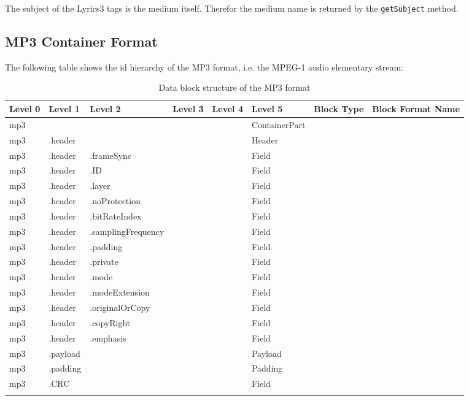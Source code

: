 
The subject of the Lyrics3 tags is the medium itself. Therefor the medium name is returned by the \texttt{getSubject} method.


\subsection{MP3 Container Format}
\label{sec:MP3ContainerFormat}

The following table shows the id hierarchy of the MP3 format, i.e. the MPEG-1 audio elementary stream:

\begin{longtable}{|p{}|p{}|p{}|p{}|p{}|p{}|p{}|}
	\hline
	Level 0 & Level 1 & Level 2 & Level 3 & Level 4 & Level 5 & Block Type & Block Format Name\\
	\endhead
	\hline
 	mp3 & & & & & ContainerPart & \\
	\hline
 	mp3 & .header & & & & Header & \\
	\hline
 	mp3 & .header & .frameSync & & & Field & \\
	\hline
 	mp3 & .header & .ID & & & Field & \\
	\hline
 	mp3 & .header & .layer & & & Field & \\
	\hline
 	mp3 & .header & .noProtection & & & Field & \\
	\hline
 	mp3 & .header & .bitRateIndex & & & Field & \\
	\hline
 	mp3 & .header & .samplingFrequency & & & Field & \\
	\hline
 	mp3 & .header & .padding & & & Field & \\
	\hline
 	mp3 & .header & .private & & & Field & \\
	\hline
 	mp3 & .header & .mode & & & Field & \\
	\hline
 	mp3 & .header & .modeExtension & & & Field & \\
	\hline
 	mp3 & .header & .originalOrCopy & & & Field & \\
	\hline
 	mp3 & .header & .copyRight & & & Field & \\
	\hline
 	mp3 & .header & .emphasis & & & Field & \\
	\hline
 	mp3 & .payload & & & & Payload & \\
	\hline
 	mp3 & .padding & & & & Padding & \\
	\hline
 	mp3 & .CRC & & & & Field & \\
	\hline
	\caption{Data block structure of the MP3 format}
	\label{tab:DatablockstructureoftheMP3formats}
\end{longtable}

